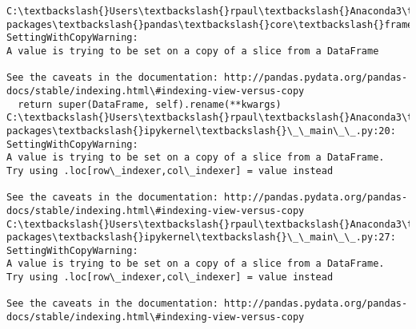 \documentclass[11pt]{article}
\begin{document}
    \begin{Verbatim}[commandchars=\\\{\}]
C:\textbackslash{}Users\textbackslash{}rpaul\textbackslash{}Anaconda3\textbackslash{}lib\textbackslash{}site-packages\textbackslash{}pandas\textbackslash{}core\textbackslash{}frame.py:3027: SettingWithCopyWarning: 
A value is trying to be set on a copy of a slice from a DataFrame

See the caveats in the documentation: http://pandas.pydata.org/pandas-docs/stable/indexing.html\#indexing-view-versus-copy
  return super(DataFrame, self).rename(**kwargs)
C:\textbackslash{}Users\textbackslash{}rpaul\textbackslash{}Anaconda3\textbackslash{}lib\textbackslash{}site-packages\textbackslash{}ipykernel\textbackslash{}\_\_main\_\_.py:20: SettingWithCopyWarning: 
A value is trying to be set on a copy of a slice from a DataFrame.
Try using .loc[row\_indexer,col\_indexer] = value instead

See the caveats in the documentation: http://pandas.pydata.org/pandas-docs/stable/indexing.html\#indexing-view-versus-copy
C:\textbackslash{}Users\textbackslash{}rpaul\textbackslash{}Anaconda3\textbackslash{}lib\textbackslash{}site-packages\textbackslash{}ipykernel\textbackslash{}\_\_main\_\_.py:27: SettingWithCopyWarning: 
A value is trying to be set on a copy of a slice from a DataFrame.
Try using .loc[row\_indexer,col\_indexer] = value instead

See the caveats in the documentation: http://pandas.pydata.org/pandas-docs/stable/indexing.html\#indexing-view-versus-copy

    \end{Verbatim}
\end{document}
